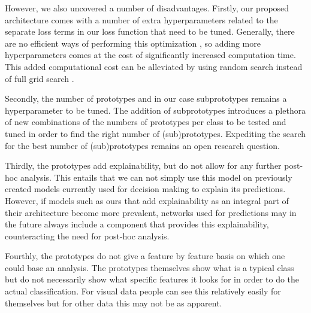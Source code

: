 However, we also uncovered a number of disadvantages. Firstly, our proposed architecture comes with a number of extra hyperparameters related to the separate loss terms in our loss function that need to be tuned. Generally, there are no efficient ways of performing this optimization \cite{paramoptimization}, so adding more hyperparameters comes at the cost of significantly increased computation time. This added computational cost can be alleviated by using random search instead of full grid search \cite{paramoptimization}.

Secondly, the number of prototypes and in our case subprototypes remains a hyperparameter to be tuned. The addition of subprototypes introduces a plethora of new combinations of the numbers of prototypes per class to be tested and tuned in order to find the right number of (sub)prototypes. Expediting the search for the best number of (sub)prototypes remains an open research question.

Thirdly, the prototypes add explainability, but do not allow for any further post-hoc analysis. This entails that we can not simply use this model on previously created models currently used for decision making to explain its predictions. However, if models such as ours that add explainability as an integral part of their architecture become more prevalent, networks used for predictions may in the future always include a component that provides this explainability, counteracting the need for post-hoc analysis.

Fourthly, the prototypes do not give a feature by feature basis on which one could base an analysis. The prototypes themselves show what is a typical class but do not necessarily show what specific features it looks for in order to do the actual classification. For visual data people can see this relatively easily for themselves but for other data this may not be as apparent. 